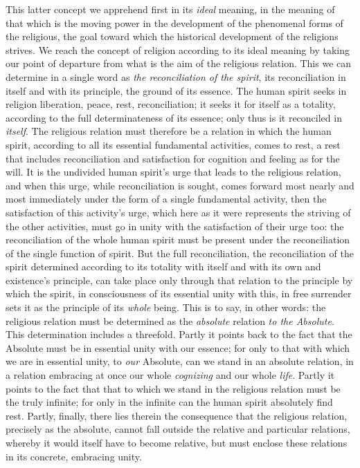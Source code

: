 \documentclass[12pt,a4paper]{book}
\begin{document}
This latter concept we apprehend first in its \emph{ideal} meaning, in the meaning of
that which is the moving power in the development of the phenomenal forms of the
religious, the goal toward which the historical development of the religions
strives. We reach the concept of religion according to its ideal meaning by
taking our point of departure from what is the aim of the religious relation.
This we can determine in a single word as \emph{the reconciliation of the spirit}, its
reconciliation in itself and with its principle, the ground of its essence. The
human spirit seeks in religion liberation, peace, rest, reconciliation; it seeks
it for itself as a totality, according to the full determinateness of its
essence; only thus is it reconciled in \emph{itself}. The religious relation must
therefore be a relation in which the human spirit, according to all its
essential fundamental activities, comes to rest, a rest that includes
reconciliation and satisfaction for cognition and feeling as for the will. It is
the undivided human spirit's urge that leads to the religious relation, and when
this urge, while reconciliation is sought, comes forward most nearly and most
immediately under the form of a single fundamental activity, then the
satisfaction of this activity's urge, which here as it were represents the
striving of the other activities, must go in unity with the satisfaction of
their urge too: the reconciliation of the whole human spirit must be present
under the reconciliation of the single function of spirit. But the full
reconciliation, the reconciliation of the spirit determined according to its
totality with itself and with its own and existence's principle, can take place
only through that relation to the principle by which the spirit, in
consciousness of its essential unity with this, in free surrender sets it as the
principle of its \emph{whole} being. This is to say, in other words: the
religious relation must be determined as the \emph{absolute} relation \emph{to the
Absolute}. This determination includes a threefold. Partly it points back to the
fact that the Absolute must be in essential unity with our essence; for only to
that with which we are in essential unity, to \emph{our} Absolute, can we stand in an
absolute relation, in a relation embracing at once our whole \emph{cognizing} and our
whole \emph{life}. Partly it points to the fact that that to which we stand in the
religious relation must be the truly infinite; for only in the infinite can the
human spirit absolutely find rest. Partly, finally, there lies therein the
consequence that the religious relation, precisely as the absolute, cannot fall
outside the relative and particular relations, whereby it would itself have to
become relative, but must enclose these relations in its concrete, embracing
unity.
\end{document}
